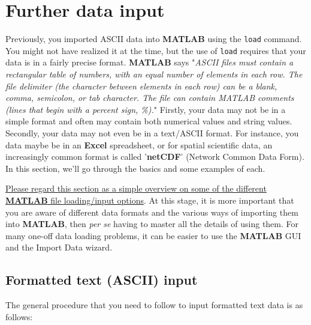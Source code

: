 \documentclass{tufte-book} %
\begin{document}

\newpage


\section{Further data input}

Previously, you imported ASCII data into \textbf{MATLAB} using the \texttt{load} command. You might not have realized it at the time, but the use of \texttt{load} requires that your data is in a fairly precise format. \textbf{MATLAB} says "\textit{ASCII files must contain a rectangular table of numbers, with an equal number of elements in each row. The file delimiter (the character between elements in each row) can be a blank, comma, semicolon, or tab character. The file can contain MATLAB comments (lines that begin with a percent sign, \%).}" Firstly, your data may not be in a simple format and often may contain both numerical values and string values. Secondly, your data may not even be in a text/ASCII format. For instance, you data maybe be in an \textbf{Excel} spreadsheet, or for spatial scientific data, an increasingly common format is called '\textbf{netCDF}' (Network Common Data Form). In this section, we'll go through the basics and some examples of each.

\uline{Please regard this section as a simple overview on some of the different \textbf{MATLAB} file loading/input options}. At this stage, it is more important that you are aware of different data formats and the various ways of importing them into \textbf{MATLAB},  then \textit{per se} having to master all the details of using them. For many one-off data loading problems, it can be easier to use the \textbf{MATLAB} GUI and the \textsf{Import Data} wizard. 


\subsection{Formatted text (ASCII) input}

The general procedure that you need to follow to input formatted text data is as follows:
\end{document}
